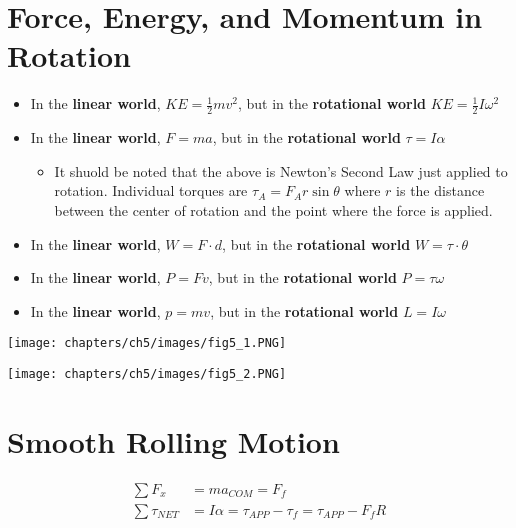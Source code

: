 \section{Force, Energy, and Momentum in Rotation}

\begin{itemize}
    \item In the \textbf{linear world}, $KE = \frac{1}{2}mv^2$, but in the \textbf{rotational world} $KE = \frac{1}{2}I\omega^2$
    \item  In the \textbf{linear world}, $F = ma$, but in the \textbf{rotational world} $\tau = I\alpha$
    \begin{itemize}
        \item It shuold be noted that the above is Newton's Second Law just applied to rotation. Individual torques are $\tau_A = F_Ar\sin\theta$ where $r$ is the distance between the center of rotation and the point where the force is applied.
    \end{itemize}
    \item In the \textbf{linear world}, $W = F \cdot d$, but in the \textbf{rotational world} $W = \tau \cdot \theta$
    \item In the \textbf{linear world}, $P = Fv$, but in the \textbf{rotational world} $P = \tau\omega$
    \item In the \textbf{linear world}, $p = mv$, but in the \textbf{rotational world} $L = I\omega$
\end{itemize}

\begin{problem}
    \begin{center}
        \texttt{[image: chapters/ch5/images/fig5\_1.PNG]}
    \end{center}
\end{problem}

\begin{problem}
    \begin{center}
        \texttt{[image: chapters/ch5/images/fig5\_2.PNG]}
    \end{center}
\end{problem}


\section{Smooth Rolling Motion}

\[
\begin{aligned}
    \sum F_x  &= ma_{COM} = F_f\\
    \sum \tau_{NET} &= I\alpha = \tau_{APP} - \tau_f = \tau_{APP} - F_fR
\end{aligned}    
\]



